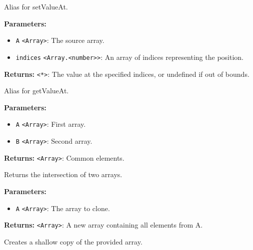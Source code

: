 \documentclass[12pt,a4paper]{article}
\begin{document}
\noindent Alias for setValueAt.

\vspace{5mm}
\noindent {}


\noindent \textbf{Parameters:}
\begin{itemize}
  \item \texttt{A} \texttt{<Array>}: The source array.
  \item \texttt{indices} \texttt{<Array.<number>>}: An array of indices representing the position.
\end{itemize}

\noindent \textbf{Returns:} \texttt{<*>}: The value at the specified indices, or undefined if out of bounds.

\noindent Alias for getValueAt.

\vspace{5mm}
\noindent {}


\noindent \textbf{Parameters:}
\begin{itemize}
  \item \texttt{A} \texttt{<Array>}: First array.
  \item \texttt{B} \texttt{<Array>}: Second array.
\end{itemize}

\noindent \textbf{Returns:} \texttt{<Array>}: Common elements.

\noindent Returns the intersection of two arrays.

\vspace{5mm}
\noindent {}


\noindent \textbf{Parameters:}
\begin{itemize}
  \item \texttt{A} \texttt{<Array>}: The array to clone.
\end{itemize}

\noindent \textbf{Returns:} \texttt{<Array>}: A new array containing all elements from A.

\noindent Creates a shallow copy of the provided array.

\vspace{5mm}
\noindent {}
\end{document}
